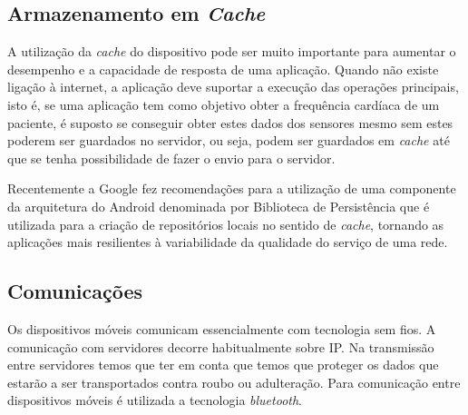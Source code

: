 \subsection{Armazenamento em \textit{Cache}}
A utilização da \textit{cache} do dispositivo pode ser muito importante para aumentar o desempenho e a capacidade de resposta de uma aplicação. Quando não existe ligação à internet, a aplicação deve suportar a execução das operações principais, isto é, se uma aplicação tem como objetivo obter a frequência cardíaca de um paciente, é suposto se conseguir obter estes dados dos sensores mesmo sem estes poderem ser guardados no servidor, ou seja, podem ser guardados em \textit{cache} até que se tenha possibilidade de fazer o envio para o servidor.\par
Recentemente a Google fez recomendações para a utilização de uma componente da arquitetura do Android denominada por Biblioteca de Persistência \cite{cache-android} que é utilizada para a criação de repositórios locais no sentido de \textit{cache}, tornando as aplicações mais resilientes à variabilidade da qualidade do serviço de uma rede.


\subsection{Comunicações}
Os dispositivos móveis comunicam essencialmente com tecnologia sem fios. A comunicação com servidores decorre habitualmente sobre IP. Na transmissão entre servidores temos que ter em conta que temos que proteger os dados que estarão a ser transportados contra roubo ou adulteração. Para comunicação entre dispositivos móveis é utilizada a tecnologia \textit{bluetooth}.


